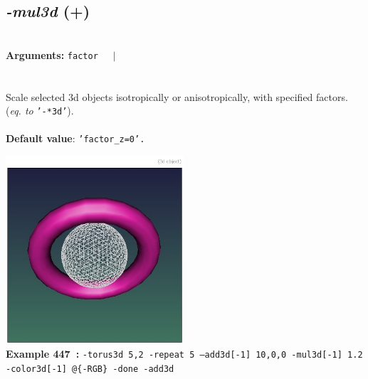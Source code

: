 \documentclass[a4paper,11pt,twoside]{book}
\begin{document}
\subsection{\emph{-mul3d} (+)}\vspace*{-0.5em}
~\\\textbf{Arguments: } 
{\small \texttt{factor}}~~~$|$\\
\\~\\
Scale selected 3d objects isotropically or anisotropically, with specified factors.
~\\(\emph{eq. to} {\small \texttt{'-*3d'}}).
~\\~\\\textbf{Default value}: {\small \texttt{'factor\_z=0'.}}
\begin{center}\includegraphics[keepaspectratio=true,height=7cm,width=\textwidth]{img/gmic_def447.jpg}\\
{\footnotesize \textbf{Example 447~:} \texttt{-torus3d 5,2 -repeat 5 --add3d[-1] 10,0,0 -mul3d[-1] 1.2 -color3d[-1] @\{-RGB\} -done -add3d}}
\end{center}
\end{document}

